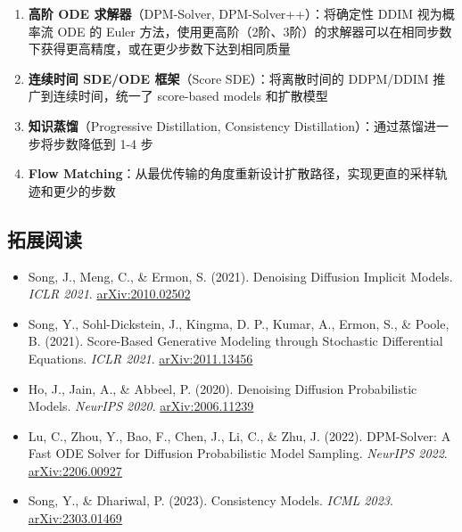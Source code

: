 \begin{enumerate}
    \item \textbf{高阶 ODE 求解器}（DPM-Solver, DPM-Solver++）：将确定性 DDIM 视为概率流 ODE 的 Euler 方法，使用更高阶（2阶、3阶）的求解器可以在相同步数下获得更高精度，或在更少步数下达到相同质量
    \item \textbf{连续时间 SDE/ODE 框架}（Score SDE）：将离散时间的 DDPM/DDIM 推广到连续时间，统一了 score-based models 和扩散模型
    \item \textbf{知识蒸馏}（Progressive Distillation, Consistency Distillation）：通过蒸馏进一步将步数降低到 1-4 步
    \item \textbf{Flow Matching}：从最优传输的角度重新设计扩散路径，实现更直的采样轨迹和更少的步数
\end{enumerate}

\subsection{拓展阅读}

\begin{itemize}
    \item Song, J., Meng, C., \& Ermon, S. (2021). Denoising Diffusion Implicit Models. \textit{ICLR 2021}. \href{https://arxiv.org/abs/2010.02502}{arXiv:2010.02502}
    \item Song, Y., Sohl-Dickstein, J., Kingma, D. P., Kumar, A., Ermon, S., \& Poole, B. (2021). Score-Based Generative Modeling through Stochastic Differential Equations. \textit{ICLR 2021}. \href{https://arxiv.org/abs/2011.13456}{arXiv:2011.13456}
    \item Ho, J., Jain, A., \& Abbeel, P. (2020). Denoising Diffusion Probabilistic Models. \textit{NeurIPS 2020}. \href{https://arxiv.org/abs/2006.11239}{arXiv:2006.11239}
    \item Lu, C., Zhou, Y., Bao, F., Chen, J., Li, C., \& Zhu, J. (2022). DPM-Solver: A Fast ODE Solver for Diffusion Probabilistic Model Sampling. \textit{NeurIPS 2022}. \href{https://arxiv.org/abs/2206.00927}{arXiv:2206.00927}
    \item Song, Y., \& Dhariwal, P. (2023). Consistency Models. \textit{ICML 2023}. \href{https://arxiv.org/abs/2303.01469}{arXiv:2303.01469}
\end{itemize}



